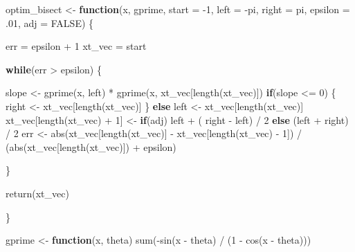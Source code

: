 \documentclass[
]{article}
\newenvironment{Shaded}{\begin{snugshade}}{\end{snugshade}}
\newcommand{\AttributeTok}[1]{\textcolor[rgb]{0.77,0.63,0.00}{#1}}
\newcommand{\ConstantTok}[1]{\textcolor[rgb]{0.00,0.00,0.00}{#1}}
\newcommand{\ControlFlowTok}[1]{\textcolor[rgb]{0.13,0.29,0.53}{\textbf{#1}}}
\newcommand{\DecValTok}[1]{\textcolor[rgb]{0.00,0.00,0.81}{#1}}
\newcommand{\FunctionTok}[1]{\textcolor[rgb]{0.00,0.00,0.00}{#1}}
\newcommand{\NormalTok}[1]{#1}
\newcommand{\OtherTok}[1]{\textcolor[rgb]{0.56,0.35,0.01}{#1}}
\newcommand{\SpecialCharTok}[1]{\textcolor[rgb]{0.00,0.00,0.00}{#1}}
\begin{document}
\begin{Shaded}
\begin{Highlighting}[]
\NormalTok{optim\_bisect }\OtherTok{\textless{}{-}} \ControlFlowTok{function}\NormalTok{(x, gprime, }\AttributeTok{start =} \SpecialCharTok{{-}}\DecValTok{1}\NormalTok{, }
                         \AttributeTok{left =} \SpecialCharTok{{-}}\NormalTok{pi, }\AttributeTok{right =}\NormalTok{ pi, }\AttributeTok{epsilon =}\NormalTok{ .}\DecValTok{01}\NormalTok{, }
                         \AttributeTok{adj =} \ConstantTok{FALSE}\NormalTok{) \{}
  
\NormalTok{  err }\OtherTok{=}\NormalTok{ epsilon }\SpecialCharTok{+} \DecValTok{1}
\NormalTok{  xt\_vec }\OtherTok{=}\NormalTok{ start}
  
  \ControlFlowTok{while}\NormalTok{(err }\SpecialCharTok{\textgreater{}}\NormalTok{ epsilon) \{}
    
\NormalTok{    slope }\OtherTok{\textless{}{-}} \FunctionTok{gprime}\NormalTok{(x, left) }\SpecialCharTok{*} \FunctionTok{gprime}\NormalTok{(x, xt\_vec[}\FunctionTok{length}\NormalTok{(xt\_vec)])}
    \ControlFlowTok{if}\NormalTok{(slope }\SpecialCharTok{\textless{}=} \DecValTok{0}\NormalTok{) \{ right }\OtherTok{\textless{}{-}}\NormalTok{ xt\_vec[}\FunctionTok{length}\NormalTok{(xt\_vec)] }
\NormalTok{    \} }\ControlFlowTok{else}\NormalTok{ left }\OtherTok{\textless{}{-}}\NormalTok{ xt\_vec[}\FunctionTok{length}\NormalTok{(xt\_vec)]}
\NormalTok{    xt\_vec[}\FunctionTok{length}\NormalTok{(xt\_vec) }\SpecialCharTok{+} \DecValTok{1}\NormalTok{] }\OtherTok{\textless{}{-}} \ControlFlowTok{if}\NormalTok{(adj) left }\SpecialCharTok{+}\NormalTok{ ( right }\SpecialCharTok{{-}}\NormalTok{ left) }\SpecialCharTok{/} \DecValTok{2} \ControlFlowTok{else}\NormalTok{ (left }\SpecialCharTok{+}\NormalTok{ right) }\SpecialCharTok{/} \DecValTok{2}
\NormalTok{    err }\OtherTok{\textless{}{-}} \FunctionTok{abs}\NormalTok{(xt\_vec[}\FunctionTok{length}\NormalTok{(xt\_vec)] }\SpecialCharTok{{-}}\NormalTok{ xt\_vec[}\FunctionTok{length}\NormalTok{(xt\_vec) }\SpecialCharTok{{-}} \DecValTok{1}\NormalTok{]) }\SpecialCharTok{/}
\NormalTok{      (}\FunctionTok{abs}\NormalTok{(xt\_vec[}\FunctionTok{length}\NormalTok{(xt\_vec)]) }\SpecialCharTok{+}\NormalTok{ epsilon)}
    
    
\NormalTok{  \}}
  
  \FunctionTok{return}\NormalTok{(xt\_vec)}
  
\NormalTok{\}}


\NormalTok{gprime }\OtherTok{\textless{}{-}} \ControlFlowTok{function}\NormalTok{(x, theta) }\FunctionTok{sum}\NormalTok{(}\SpecialCharTok{{-}}\FunctionTok{sin}\NormalTok{(x }\SpecialCharTok{{-}}\NormalTok{ theta) }\SpecialCharTok{/} 
\NormalTok{                                   (}\DecValTok{1} \SpecialCharTok{{-}} \FunctionTok{cos}\NormalTok{(x }\SpecialCharTok{{-}}\NormalTok{ theta)))}


\end{Highlighting}
\end{Shaded}
\end{document}
